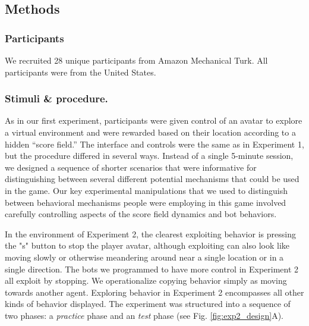 \documentclass[12pt,letterpaper]{article}
\begin{document}
\subsection{Methods}
\subsubsection{Participants}

We recruited 28 unique participants from Amazon Mechanical Turk.
All participants were from the United States.

\subsubsection{Stimuli \& procedure.}

As in our first experiment, participants were given control of an avatar to explore a virtual environment and were rewarded based on their location according to a hidden ``score field.'' 
The interface and controls were the same as in Experiment 1, but the procedure differed in several ways. 
Instead of a single 5-minute session, we designed a sequence of shorter scenarios that were informative for distinguishing between several different potential mechanisms that could be used in the game. Our key experimental manipulations that we used to distinguish between behavioral mechanisms people were employing in this game involved carefully controlling aspects of the score field dynamics and bot behaviors. 

In the environment of Experiment 2, the clearest exploiting behavior is pressing the "s" button to stop the player avatar, although exploiting can also look like moving slowly or otherwise meandering around near a single location or in a single direction.  The bots we programmed to have more control in Experiment 2 all exploit by stopping.  We operationalize copying behavior simply as moving towards another agent.  Exploring behavior in Experiment 2 encompasses all other kinds of behavior displayed.
The experiment was structured into a sequence of two phases: a \emph{practice} phase and an \emph{test} phase (see Fig. \ref{fig:exp2_design}A).
\end{document}
